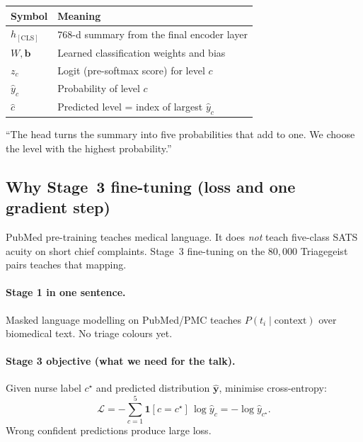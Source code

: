 \begin{center}
\small
\begin{tabular}{@{}lp{9cm}@{}}
\toprule
Symbol & Meaning \\
\midrule
\(h_{\mathrm{[CLS]}}\) & 768-d summary from the final encoder layer \\
\(W,\mathbf{b}\) & Learned classification weights and bias \\
\(z_c\) & Logit (pre-softmax score) for level \(c\) \\
\(\hat{y}_c\) & Probability of level \(c\) \\
\(\hat{c}\) & Predicted level = index of largest \(\hat{y}_c\) \\
\bottomrule
\end{tabular}
\end{center}

\begin{saybox}
``The head turns the summary into five probabilities that add to one. We choose the level with the highest probability.''
\end{saybox}

\subsection{Why Stage~3 fine-tuning (loss and one gradient step)}
\label{sec:expl-loss}

\begin{intuitbox}
PubMed pre-training teaches medical language. It does \emph{not} teach five-class SATS acuity on short chief complaints.
Stage~3 fine-tuning on the \(80{,}000\) Triagegeist pairs teaches that mapping.
\end{intuitbox}

\paragraph{Stage 1 in one sentence.}
Masked language modelling on PubMed/PMC teaches \(P(t_i \mid \text{context})\) over biomedical text.
No triage colours yet.

\paragraph{Stage 3 objective (what we need for the talk).}
Given nurse label \(c^\star\) and predicted distribution \(\hat{\mathbf{y}}\), minimise cross-entropy:
\begin{equation}
  \mathcal{L} = -\sum_{c=1}^{5} \mathbf{1}[c=c^\star]\,\log \hat{y}_c = -\log \hat{y}_{c^\star}.
  \label{eq:CE}
\end{equation}
Wrong confident predictions produce large loss.

